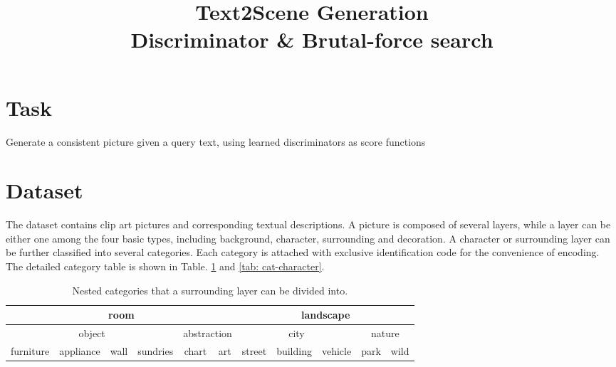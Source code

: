 \documentclass{article} %
\title{Text2Scene Generation \\ Discriminator \& Brutal-force search}
\author{
}
\begin{document}
\maketitle

\begin{abstract}
\end{abstract}

\section{Task}
Generate a consistent picture given a query text, using learned discriminators as score functions

\section{Dataset}
The dataset contains clip art pictures and corresponding textual descriptions. A picture is composed of several layers, while a layer can be either one among the four basic types, including background, character, surrounding and decoration. A character or surrounding layer can be further classified into several categories. Each category is attached with exclusive identification code for the convenience of encoding. The detailed category table is shown in Table. \ref{tab: cat-surrounding} and \ref{tab: cat-character}.

\begin{table}[!h]
	\caption{Nested categories that a surrounding layer can be divided into.}
	\centering
	\begin{tabular}{cccc|cc|ccc|cc}
		\toprule
		 \multicolumn{6}{c|}{room} & \multicolumn{5}{c}{landscape} \\
		 \midrule
		  \multicolumn{4}{c|}{object} &  \multicolumn{2}{c|}{abstraction} &  \multicolumn{3}{c|}{city} &  \multicolumn{2}{c}{nature} \\
		 \midrule
		 furniture & appliance & wall & sundries & chart & art & street & building & vehicle & park & wild \\
		 \bottomrule
	\end{tabular}
	\label{tab: cat-surrounding}
\end{table}

\begin{table}[htbp]
	\caption{Nested categories that a character layer can be divided into.}
	\centering
	\label{tab: cat-character}
\end{table}
\end{document}

